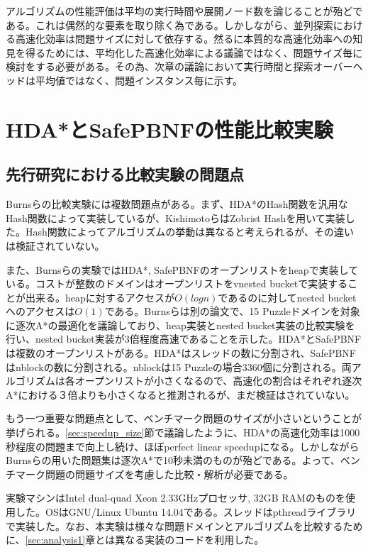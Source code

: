 \documentclass[uplatex]{jsarticle}
\begin{document}
アルゴリズムの性能評価は平均の実行時間や展開ノード数を論じることが殆どである。これは偶然的な要素を取り除く為である。しかしながら、並列探索における高速化効率は問題サイズに対して依存する。然るに本質的な高速化効率への知見を得るためには、平均化した高速化効率による議論ではなく、問題サイズ毎に検討をする必要がある。その為、次章の議論において実行時間と探索オーバーヘッドは平均値ではなく、問題インスタンス毎に示す。

\newpage

\section{HDA*とSafePBNFの性能比較実験}
\label{sec:analysis2}

\subsection{先行研究における比較実験の問題点}

Burnsらの比較実験には複数問題点がある\cite{Burns2010}。まず、HDA*のHash関数を汎用なHash関数によって実装しているが、KishimotoらはZobrist Hashを用いて実装した。Hash関数によってアルゴリズムの挙動は異なると考えられるが、その違いは検証されていない。

また、Burnsらの実験ではHDA*, SafePBNFのオープンリストをheapで実装している。コストが整数のドメインはオープンリストをvnested bucketで実装することが出来る。heapに対するアクセスが$O(logn)$であるのに対してnested bucketへのアクセスは$O(1)$である。Burnsらは別の論文で、15 Puzzleドメインを対象に逐次A*の最適化を議論しており、heap実装とnested bucket実装の比較実験を行い、nested bucket実装が3倍程度高速であることを示した\cite{Burns2012implementing}。HDA*とSafePBNFは複数のオープンリストがある。HDA*はスレッドの数に分割され、SafePBNFはnblockの数に分割される。nblockは15 Puzzleの場合3360個に分割される。両アルゴリズムは各オープンリストが小さくなるので、高速化の割合はそれぞれ逐次A*における３倍よりも小さくなると推測されるが、まだ検証はされていない。

もう一つ重要な問題点として、ベンチマーク問題のサイズが小さいということが挙げられる。\ref{sec:speedup_size}節で議論したように、HDA*の高速化効率は1000秒程度の問題まで向上し続け、ほぼperfect linear speedupになる。しかしながらBurnsらの用いた問題集は逐次A*で10秒未満のものが殆どである。よって、ベンチマーク問題の問題サイズを考慮した比較・解析が必要である。

実験マシンはIntel dual-quad Xeon 2.33GHzプロセッサ, 32GB RAMのものを使用した。OSはGNU/Linux Ubuntu 14.04である。スレッドはpthreadライブラリで実装した。なお、本実験は様々な問題ドメインとアルゴリズムを比較するために、\ref{sec:analysis1}章とは異なる実装のコードを利用した。
\end{document}
